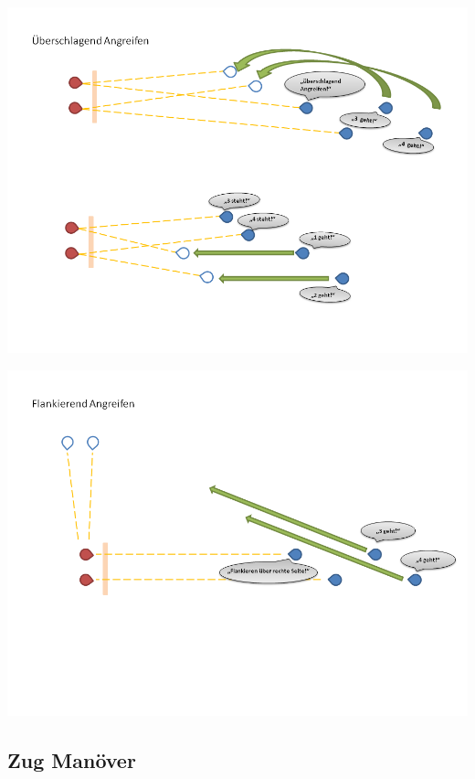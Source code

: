 \begin{minipage}[t]{1\textwidth}
	\includegraphics[width=\textwidth]{./Grafiken/Abschnitt/Ueberschlagen_Trupp.png}
\end{minipage}

\begin{minipage}[t]{1\textwidth}
	\includegraphics[width=\textwidth]{./Grafiken/Abschnitt/Ueberschlagen_Trupp_2.png}
\end{minipage}

\subsection{Zug Manöver}